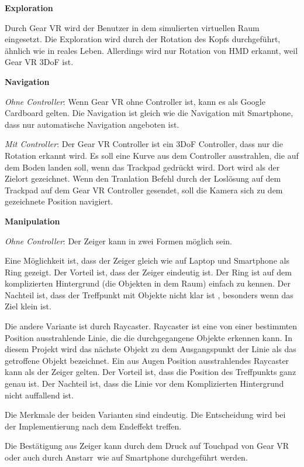   \textbf{Exploration}
  
  Durch Gear VR wird der Benutzer in dem simulierten virtuellen Raum eingesetzt. Die Exploration wird durch der Rotation des Kopfs durchgeführt, ähnlich wie in reales Leben. Allerdings wird nur Rotation von HMD erkannt, weil Gear VR 3DoF ist.
  
  \textbf{Navigation}
  
  \textsl{Ohne Controller}: Wenn Gear VR ohne Controller ist, kann es als Google Cardboard gelten. Die Navigation ist gleich wie die Navigation mit Smartphone, dass nur automatische Navigation angeboten ist.
 
  \textsl{Mit Controller}: Der Gear VR Controller ist ein 3DoF Controller, dass nur die Rotation erkannt wird. Es soll eine Kurve aus dem Controller ausstrahlen, die auf dem Boden landen soll, wenn das Trackpad gedrückt wird. Dort wird als der Zielort gezeichnet. Wenn den Tranlation Befehl durch der Loslösung auf dem Trackpad auf dem Gear VR Controller gesendet, soll die Kamera sich zu dem gezeichnete Position navigiert.

  \textbf{Manipulation}
  
  \textsl{Ohne Controller}: Der Zeiger kann in zwei Formen möglich sein.
  
  Eine Möglichkeit ist, dass der Zeiger gleich wie auf Laptop und Smartphone als Ring gezeigt. Der Vorteil ist, dass der Zeiger eindeutig ist. Der Ring ist auf dem komplizierten Hintergrund (die Objekten in dem Raum) einfach zu kennen. Der Nachteil ist, dass der Treffpunkt mit Objekte nicht klar ist , besonders wenn das Ziel klein ist.
  
  Die andere Variante ist durch Raycaster. Raycaster ist eine von einer bestimmten Position ausstrahlende Linie, die die durchgegangene Objekte erkennen kann. In diesem Projekt wird das nächste Objekt zu dem Ausgangspunkt der Linie als das getroffene Objekt bezeichnet. Ein aus Augen Position ausstrahlendes Raycaster kann als der Zeiger gelten. Der Vorteil ist, dass die Position des Treffpunkts ganz genau ist. Der Nachteil ist, dass die Linie vor dem Komplizierten Hintergrund nicht auffallend ist.
  
  Die Merkmale der beiden Varianten sind eindeutig. Die Entscheidung wird bei der Implementierung nach dem Endeffekt treffen.
  
  Die Bestätigung aus Zeiger kann durch dem Druck auf Touchpad von Gear VR oder auch durch \glqq Anstarr\grqq\ wie auf Smartphone durchgeführt werden.
  
